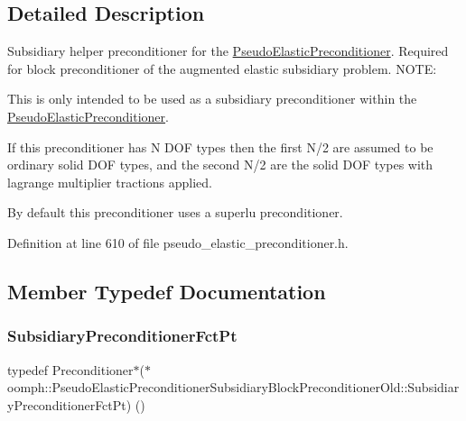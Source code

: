 \subsection{Detailed Description}
Subsidiary helper preconditioner for the \hyperlink{classoomph_1_1PseudoElasticPreconditioner}{Pseudo\+Elastic\+Preconditioner}. Required for block preconditioner of the augmented elastic subsidiary problem. N\+O\+TE\+:
\begin{DoxyEnumerate}
\item This is only intended to be used as a subsidiary preconditioner within the \hyperlink{classoomph_1_1PseudoElasticPreconditioner}{Pseudo\+Elastic\+Preconditioner}.
\item If this preconditioner has N D\+OF types then the first N/2 are assumed to be ordinary solid D\+OF types, and the second N/2 are the solid D\+OF types with lagrange multiplier tractions applied.
\item By default this preconditioner uses a superlu preconditioner. 
\end{DoxyEnumerate}

Definition at line 610 of file pseudo\+\_\+elastic\+\_\+preconditioner.\+h.



\subsection{Member Typedef Documentation}
\mbox{\label{classoomph_1_1PseudoElasticPreconditionerSubsidiaryBlockPreconditionerOld_a85f57923e70244d5fde0538946eb8c3d}} 
\subsubsection{\texorpdfstring{Subsidiary\+Preconditioner\+Fct\+Pt}{SubsidiaryPreconditionerFctPt}}
{\footnotesize\ttfamily typedef Preconditioner$\ast$($\ast$ oomph\+::\+Pseudo\+Elastic\+Preconditioner\+Subsidiary\+Block\+Preconditioner\+Old\+::\+Subsidiary\+Preconditioner\+Fct\+Pt) ()}



